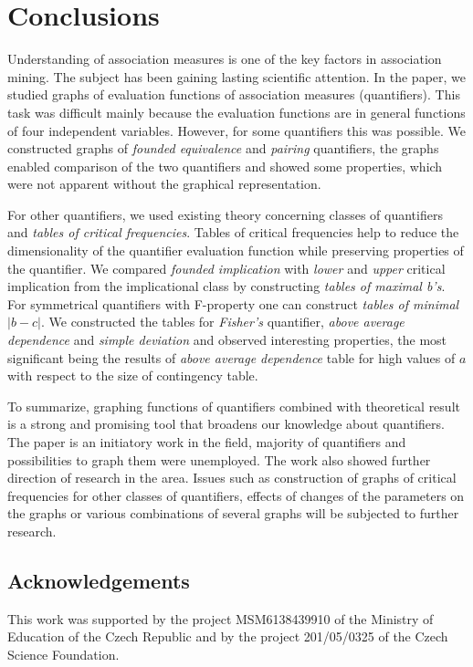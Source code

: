 \section{Conclusions} \label{Conclusions}
Understanding of association measures is one of the key factors in association mining. The subject has been gaining lasting scientific attention. In the paper, we studied graphs of evaluation functions of association measures (quantifiers). This task was difficult mainly because the evaluation functions are in general functions of four independent variables. However, for some quantifiers this was possible. We constructed graphs of \emph{founded equivalence} and \emph{pairing} quantifiers, the graphs enabled comparison of the two quantifiers and showed some properties, which were not apparent without the graphical representation. 

For other quantifiers, we used existing theory concerning classes of quantifiers and \emph{tables of critical frequencies}. Tables of critical frequencies help to reduce the dimensionality of the quantifier evaluation function while preserving properties of the quantifier. We compared \emph{founded implication} with \emph{lower} and \emph{upper} critical implication from the implicational class by constructing \emph{tables of maximal b's}. For symmetrical quantifiers with F-property one can construct \emph{tables of minimal $|b-c|$}. We constructed the tables for \emph{Fisher's} quantifier, \emph{above average dependence} and \emph{simple deviation} and observed interesting properties, the most significant being the results of \emph{above average dependence} table for high values of $a$ with respect to the size of contingency table. 

To summarize, graphing functions of quantifiers combined with theoretical result is a strong and promising tool that broadens our knowledge about quantifiers. The paper is an initiatory work in the field, majority of quantifiers and possibilities to graph them were unemployed. The work also showed further direction of research in the area. Issues such as construction of graphs of critical frequencies for other classes of quantifiers, effects of changes of the parameters on the graphs or various combinations of several graphs will be subjected to further research. 

\subsection*{Acknowledgements}
This work was supported by the project MSM6138439910 of the Ministry of Education of the Czech Republic and by the project 201/05/0325 of the Czech Science Foundation.